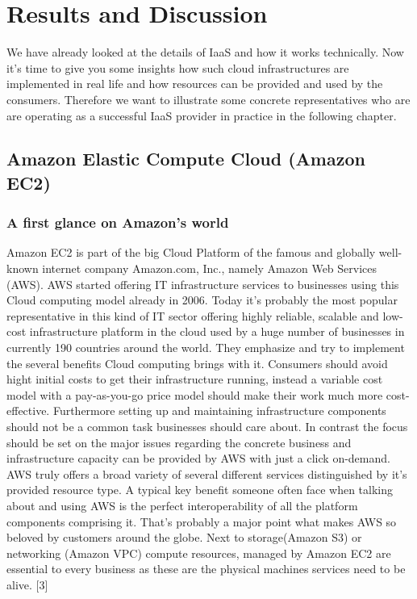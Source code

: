 \chapter{Results and Discussion}
\label{chap:evaluation}
We have already looked at the details of IaaS and how it works technically.
Now it's time to give you some insights how such cloud infrastructures are implemented in real life and how resources can be provided and used by the consumers. Therefore we want to illustrate some concrete representatives who are are operating as a successful IaaS provider in practice in the following chapter.

\section{Amazon Elastic Compute Cloud (Amazon EC2)}

\subsection{A first glance on Amazon's world}
Amazon EC2 is part of the big Cloud Platform of the famous and globally well-known internet company Amazon.com, Inc., namely Amazon Web Services (AWS). AWS started offering IT infrastructure services to businesses using this Cloud computing model already in 2006. Today it's probably the most popular representative in this kind of IT sector offering highly reliable, scalable and low-cost infrastructure platform in the cloud used by a huge number of businesses in currently 190 countries around the world. They emphasize and try to implement the several benefits Cloud computing brings with it. Consumers should avoid hight initial costs to get their infrastructure running, instead a variable cost model with a pay-as-you-go price model should make their work much more cost-effective. Furthermore setting up and maintaining infrastructure components should not be a common task businesses should care about. In contrast the focus should be set on the major issues regarding the concrete business and infrastructure capacity can be provided by AWS with just a click on-demand. AWS truly offers a broad variety of several different services distinguished by it's provided resource type. A typical key benefit someone often face when talking about and using AWS is the perfect interoperability of all the platform components comprising it. That's probably a major point what makes AWS so beloved by customers around the globe. Next to storage(Amazon S3) or networking (Amazon VPC) compute resources, managed by Amazon EC2 are essential to every business as these are the physical machines services need to be alive. [3]

